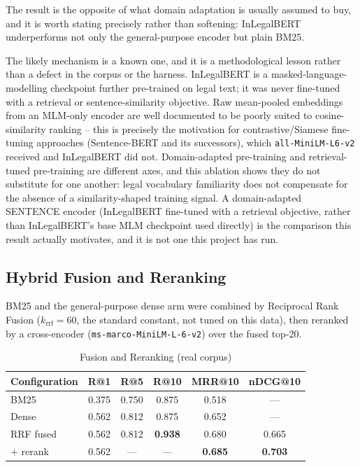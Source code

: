 \documentclass[conference]{IEEEtran}
\begin{document}
The result is the opposite of what domain adaptation is usually assumed to
buy, and it is worth stating precisely rather than softening: InLegalBERT
underperforms not only the general-purpose encoder but plain BM25.

The likely mechanism is a known one, and it is a methodological lesson rather
than a defect in the corpus or the harness. InLegalBERT is a masked-language-
modelling checkpoint further pre-trained on legal text; it was never
fine-tuned with a retrieval or sentence-similarity objective. Raw mean-pooled
embeddings from an MLM-only encoder are well documented to be poorly suited to
cosine-similarity ranking -- this is precisely the motivation for
contrastive/Siamese fine-tuning approaches (Sentence-BERT and its
successors), which \texttt{all-MiniLM-L6-v2} received and InLegalBERT did not.
Domain-adapted pre-training and retrieval-tuned pre-training are different
axes, and this ablation shows they do not substitute for one another: legal
vocabulary familiarity does not compensate for the absence of a
similarity-shaped training signal. A domain-adapted SENTENCE encoder
(InLegalBERT fine-tuned with a retrieval objective, rather than InLegalBERT's
base MLM checkpoint used directly) is the comparison this result actually
motivates, and it is not one this project has run.

\subsection{Hybrid Fusion and Reranking}
\label{ssec:fusion}

BM25 and the general-purpose dense arm were combined by Reciprocal Rank
Fusion ($k_{\text{rrf}}=60$, the standard constant, not tuned on this data),
then reranked by a cross-encoder (\texttt{ms-marco-MiniLM-L-6-v2}) over the
fused top-20.

\begin{table}[t]
\caption{Fusion and Reranking (real corpus)}
\label{tab:fusion}
\centering
\footnotesize
\begin{tabular}{@{}lccccc@{}}
\toprule
\textbf{Configuration} & \textbf{R@1} & \textbf{R@5} & \textbf{R@10} & \textbf{MRR@10} & \textbf{nDCG@10} \\
\midrule
BM25       & 0.375 & 0.750 & 0.875 & 0.518 & --- \\
Dense      & 0.562 & 0.812 & 0.875 & 0.652 & --- \\
RRF fused  & 0.562 & 0.812 & \textbf{0.938} & 0.680 & 0.665 \\
$+$ rerank & 0.562 & --- & --- & \textbf{0.685} & \textbf{0.703} \\
\bottomrule
\end{tabular}
\end{table}
\end{document}
